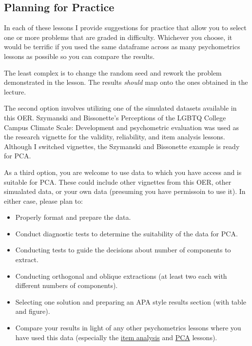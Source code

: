 \documentclass[
  english,
]{book}
\providecommand{\tightlist}{%
  \setlength{\itemsep}{0pt}\setlength{\parskip}{0pt}}
\begin{document}
\hypertarget{planning-for-practice-7}{%
\subsection{Planning for Practice}\label{planning-for-practice-7}}

In each of these lessons I provide suggestions for practice that allow you to select one or more problems that are graded in difficulty. Whichever you choose, it would be terrific if you used the same dataframe across as many psychometrics lessons as possible so you can compare the results.

The least complex is to change the random seed and rework the problem demonstrated in the lesson. The results \emph{should} map onto the ones obtained in the lecture.

The second option involves utilizing one of the simulated datasets available in this OER. Szymanski and Bissonette's \citeyearpar{szymanski_perceptions_2020}Perceptions of the LGBTQ College Campus Climate Scale: Development and psychometric evaluation was used as the research vignette for the validity, reliability, and item analysis lessons. Although I switched vignettes, the Szymanski and Bissonette example is ready for PCA.

As a third option, you are welcome to use data to which you have access and is suitable for PCA. These could include other vignettes from this OER, other simualated data, or your own data (presuming you have permissoin to use it). In either case, please plan to:

\begin{itemize}
\tightlist
\item
  Properly format and prepare the data.
\item
  Conduct diagnostic tests to determine the suitability of the data for PCA.
\item
  Conducting tests to guide the decisions about number of components to extract.
\item
  Conducting orthogonal and oblique extractions (at least two each with different numbers of components).
\item
  Selecting one solution and preparing an APA style results section (with table and figure).
\item
  Compare your results in light of any other psychometrics lessons where you have used this data (especially the \protect\hyperlink{ItemAnalSurvey}{item analysis} and \protect\hyperlink{PCA}{PCA} lessons).
\end{itemize}
\end{document}
